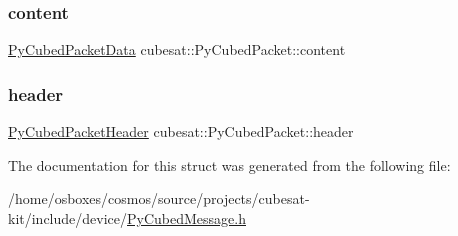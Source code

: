 \subsubsection{\texorpdfstring{content}{content}}
{\footnotesize\ttfamily \hyperlink{structcubesat_1_1PyCubedPacketData}{Py\+Cubed\+Packet\+Data} cubesat\+::\+Py\+Cubed\+Packet\+::content}

\mbox{\label{structcubesat_1_1PyCubedPacket_a3fee0058b22c1346c8d21b2985c6d49d}} 
\subsubsection{\texorpdfstring{header}{header}}
{\footnotesize\ttfamily \hyperlink{structcubesat_1_1PyCubedPacketHeader}{Py\+Cubed\+Packet\+Header} cubesat\+::\+Py\+Cubed\+Packet\+::header}



The documentation for this struct was generated from the following file\+:\begin{DoxyCompactItemize}
\item 
/home/osboxes/cosmos/source/projects/cubesat-\/kit/include/device/\hyperlink{PyCubedMessage_8h}{Py\+Cubed\+Message.\+h}\end{DoxyCompactItemize}
